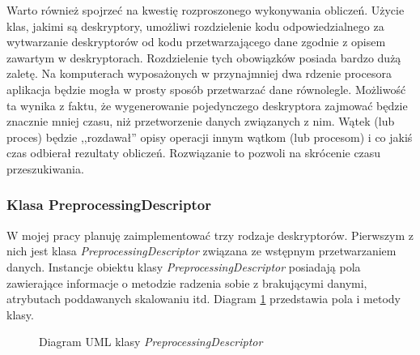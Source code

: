 \documentclass[../thesis.tex]{subfiles}
\begin{document}
Warto również spojrzeć na kwestię rozproszonego wykonywania obliczeń. Użycie klas, jakimi są deskryptory, umożliwi rozdzielenie kodu odpowiedzialnego za wytwarzanie deskryptorów od kodu przetwarzającego dane zgodnie z opisem zawartym w deskryptorach. Rozdzielenie tych obowiązków posiada bardzo dużą zaletę. Na komputerach wyposażonych w przynajmniej dwa rdzenie procesora aplikacja będzie mogła w prosty sposób przetwarzać dane równolegle. Możliwość ta wynika z faktu, że wygenerowanie pojedynczego deskryptora zajmować będzie znacznie mniej czasu, niż przetworzenie danych związanych z nim. Wątek (lub proces) będzie ,,rozdawał'' opisy operacji innym wątkom (lub procesom) i co jakiś czas odbierał rezultaty obliczeń. Rozwiązanie to pozwoli na skrócenie czasu przeszukiwania.

\subsubsection{Klasa PreprocessingDescriptor}

W mojej pracy planuję zaimplementować trzy rodzaje deskryptorów. Pierwszym z nich jest klasa \emph{PreprocessingDescriptor} związana ze wstępnym przetwarzaniem danych. Instancje obiektu klasy \emph{PreprocessingDescriptor} posiadają pola zawierające informacje o metodzie radzenia sobie z brakującymi danymi, atrybutach poddawanych skalowaniu itd. Diagram \ref{proj:diagram_preprocessing_descriptor} przedstawia pola i metody klasy.

\begin{figure}[h]
\centering
{}
\caption{Diagram UML klasy \emph{PreprocessingDescriptor}}
\label{proj:diagram_preprocessing_descriptor}
\end{figure}
\end{document}
